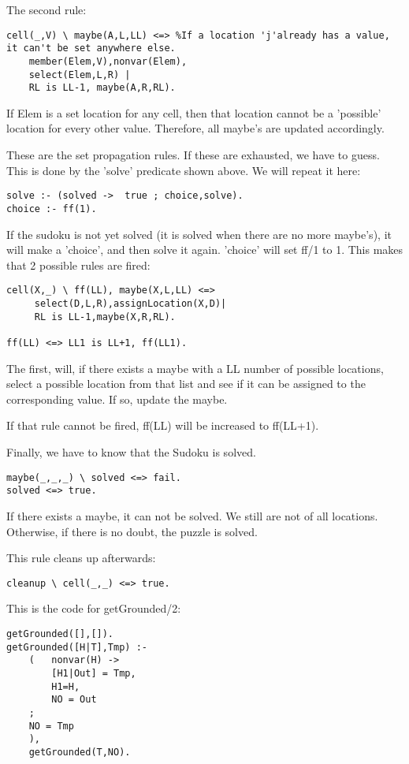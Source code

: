 The second rule:
\begin{lstlisting}
cell(_,V) \ maybe(A,L,LL) <=> %If a location 'j'already has a value, it can't be set anywhere else.
	member(Elem,V),nonvar(Elem),
	select(Elem,L,R) |
	RL is LL-1, maybe(A,R,RL).
\end{lstlisting}

	
If Elem is a set location for any cell, then that location cannot be a 'possible' location for every other value. Therefore, all maybe's are updated accordingly.

These are the set propagation rules. If these are exhausted, we have to guess. This is done by the 'solve' predicate shown above. We will repeat it here:
\begin{lstlisting}
solve :- (solved ->  true ; choice,solve).
choice :- ff(1).
\end{lstlisting}

If the sudoku is not yet solved (it is solved when there are no more maybe's), it will make a 'choice', and then solve it again. 'choice' will set ff/1 to 1. This makes that 2 possible rules are fired:
\begin{lstlisting}
cell(X,_) \ ff(LL), maybe(X,L,LL) <=>
	 select(D,L,R),assignLocation(X,D)|
	 RL is LL-1,maybe(X,R,RL).

ff(LL) <=> LL1 is LL+1, ff(LL1). 
\end{lstlisting}


The first, will, if there exists a maybe with a LL number of possible locations, select a possible location from that list and see if it can be assigned to the corresponding value. If so, update the maybe.

If that rule cannot be fired, ff(LL) will be increased to ff(LL+1).

Finally, we have to know that the Sudoku is solved. 
\begin{lstlisting}
maybe(_,_,_) \ solved <=> fail.
solved <=> true.
\end{lstlisting}

If there exists a maybe, it can not be solved. We still are not of all locations.
Otherwise, if there is no doubt, the puzzle is solved.

This rule cleans up afterwards:
\begin{lstlisting}
cleanup \ cell(_,_) <=> true.
\end{lstlisting}

This is the code for getGrounded/2:
\begin{lstlisting}
getGrounded([],[]).
getGrounded([H|T],Tmp) :-
	(   nonvar(H) ->
	    [H1|Out] = Tmp,
	    H1=H,
	    NO = Out
	;
	NO = Tmp
	),
	getGrounded(T,NO).
\end{lstlisting}

